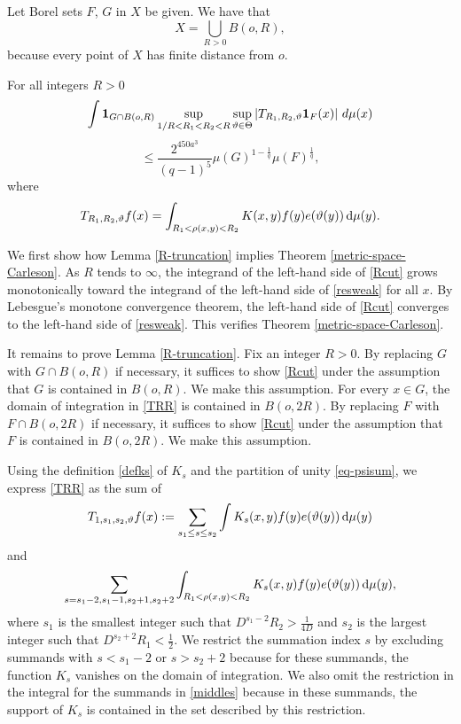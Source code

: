Let Borel sets $F$, $G$ in $X$ be given.
We have that
\begin{equation}
    X=\bigcup_{R>0}B(o,R),
\end{equation} because every point of $X$
has finite distance from $o$.
\begin{lemma}[R truncation]
\label{R-truncation}
For all integers $R>0$
$$
    \int \mathbf{1}_{G\cap B(o,R)}
    \sup_{1/R<R_1<R_2<R}\sup_{{\vartheta}\in{\Theta}}
    \left| T_{R_1,R_2,{\vartheta}} \mathbf{1}_{F}(x) \right|\, d\mu(x)
$$
\begin{equation} \label{Rcut}
    \leq \frac{2^{450a^3}}{(q-1)^5} \mu(G)^{1-\frac{1}{q}} \mu(F)^{\frac{1}{q}},
\end{equation}
where
\begin{equation}\label{TRR}
    T_{R_1,R_2,{\vartheta}} f(x)=
    \int_{R_1 <  \rho(x,y) < R_2}  K(x,y) f(y) e({\vartheta}(y)) \, \mathrm{d}\mu(y) .
\end{equation}
\end{lemma}

We first show how Lemma \ref{R-truncation} implies Theorem \ref{metric-space-Carleson}. As $R$ tends to $\infty$, the integrand of the left-hand side of \eqref{Rcut} grows monotonically toward the integrand of the left-hand side of \eqref{resweak} for all $x$. By Lebesgue's monotone convergence theorem, the left-hand side of \eqref{Rcut} converges to the left-hand side of \eqref{resweak}. This verifies Theorem \ref{metric-space-Carleson}.

It remains to prove Lemma \ref{R-truncation}. Fix an integer $R>0$. By replacing $G$ with $G\cap B(o,R)$ if necessary, it suffices to show \eqref{Rcut} under the assumption that $G$ is contained in $B(o,R)$. We make this assumption. For every $x\in G$, the domain of integration in \eqref{TRR} is contained in $B(o,2R)$. By replacing $F$ with $F\cap B(o,2R)$ if necessary, it suffices to show \eqref{Rcut} under the assumption that $F$ is contained in $B(o,2R)$. We make this assumption.

Using the definition \eqref{defks} of $K_s$ and the partition of unity \eqref{eq-psisum}, we express \eqref{TRR} as the sum of
\begin{equation}\label{middles}
{T}_{1,s_1,s_2,{\vartheta}}f(x):=\sum_{s_1 \le s\le s_2}
\int K_s(x,y)  f(y) e({\vartheta}(y)) \, \mathrm{d}\mu(y)
\end{equation}
and
\begin{equation}\label{boundarys}
\sum_{s=s_1-2,s_1-1, s_2+1, s_2+2}
\int_{R_1 <  \rho(x,y) < R_2}  K_s(x,y) f(y) e({\vartheta}(y)) \,
 \mathrm{d}\mu(y),
\end{equation}
where $s_1$ is the smallest integer such that $D^{s_1-2}R_2>\frac 1{4D}$ and $s_2$ is the largest integer such that $D^{s_2+2}R_1<\frac 12$. We restrict the summation index $s$ by excluding summands with $s<s_1-2$ or $s>s_2+2$ because for these summands, the function $K_s$ vanishes on the domain of integration. We also omit the restriction in the integral for the summands in \eqref{middles} because in these summands, the support of $K_s$ is contained in the set described by this restriction.



